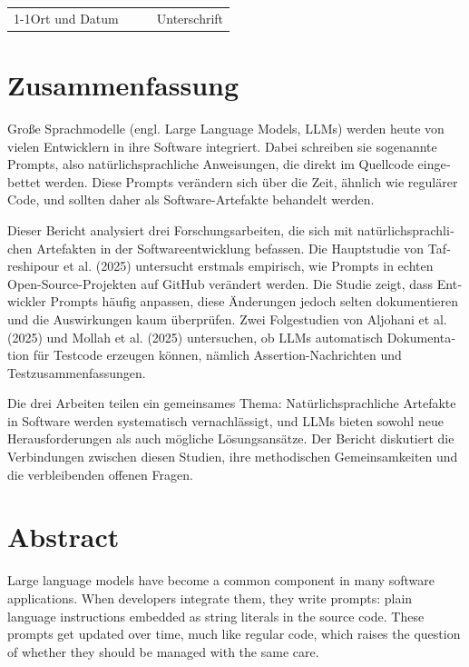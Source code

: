 \documentclass[
    pdftex,
    final,
    11pt,
    a4paper,
    parskip=false,
    oneside,
    footheight=0mm,
    footinclude=false,
    toc=bibliography
]{scrbook}
\begin{document}
\begin{otherlanguage}{ngerman}
\vspace{2cm}

\noindent\begin{tabularx}{\textwidth}{XXXX}
	&&& \\
	\cline{1-1}\cline{4-4}\footnotesize\centering Ort und Datum		&&& \footnotesize\centering Unterschrift
\end{tabularx}

\newpage

\chapter*{Zusammenfassung}

Große Sprachmodelle (engl. Large Language Models, LLMs) werden heute von vielen Entwicklern in ihre Software integriert. Dabei schreiben sie sogenannte Prompts, also natürlichsprachliche Anweisungen, die direkt im Quellcode eingebettet werden. Diese Prompts verändern sich über die Zeit, ähnlich wie regulärer Code, und sollten daher als Software-Artefakte behandelt werden.

Dieser Bericht analysiert drei Forschungsarbeiten, die sich mit natürlichsprachlichen Artefakten in der Softwareentwicklung befassen. Die Hauptstudie von Tafreshipour et al. (2025) untersucht erstmals empirisch, wie Prompts in echten Open-Source-Projekten auf GitHub verändert werden. Die Studie zeigt, dass Entwickler Prompts häufig anpassen, diese Änderungen jedoch selten dokumentieren und die Auswirkungen kaum überprüfen. Zwei Folgestudien von Aljohani et al. (2025) und Mollah et al. (2025) untersuchen, ob LLMs automatisch Dokumentation für Testcode erzeugen können, nämlich Assertion-Nachrichten und Testzusammenfassungen.

Die drei Arbeiten teilen ein gemeinsames Thema: Natürlichsprachliche Artefakte in Software werden systematisch vernachlässigt, und LLMs bieten sowohl neue Herausforderungen als auch mögliche Lösungsansätze. Der Bericht diskutiert die Verbindungen zwischen diesen Studien, ihre methodischen Gemeinsamkeiten und die verbleibenden offenen Fragen.

\end{otherlanguage}

\chapter*{Abstract}

Large language models have become a common component in many software applications. When developers integrate them, they write prompts: plain language instructions embedded as string literals in the source code. These prompts get updated over time, much like regular code, which raises the question of whether they should be managed with the same care.
\end{document}
